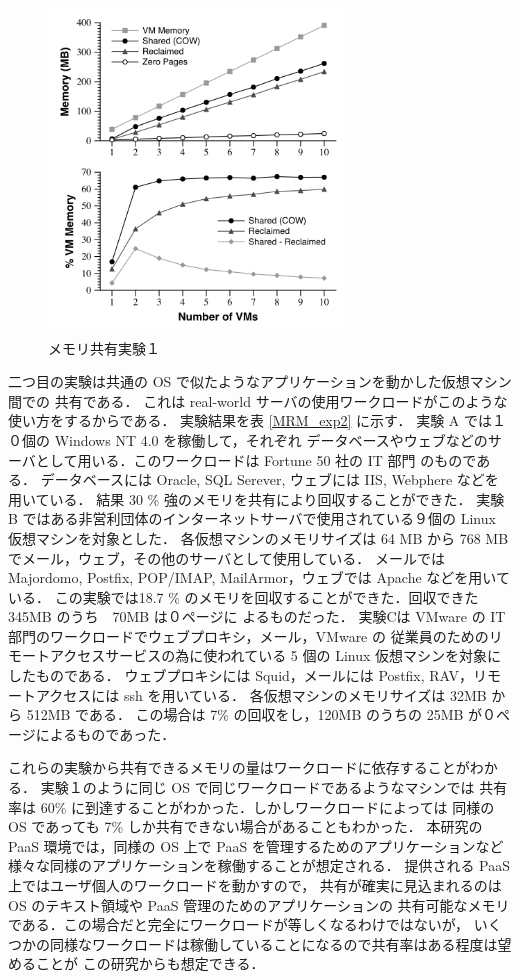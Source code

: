\documentclass[graduation-thesis]{mlarticle}
\begin{document}
\begin{figure}[H]\begin{center}\includegraphics[width=8.0cm]{./img/MRM_exp1.png}\caption{ メモリ共有実験１}\label{MRM_exp1}\end{center}\end{figure}

二つ目の実験は共通の OS で似たようなアプリケーションを動かした仮想マシン間での
共有である．
これは real-world サーバの使用ワークロードがこのような使い方をするからである．
実験結果を表 \ref{MRM_exp2} に示す．
実験 A では１０個の Windows NT 4.0 を稼働して，それぞれ
データベースやウェブなどのサーバとして用いる．このワークロードは Fortune 50 社の IT 部門
のものである．
データベースには Oracle, SQL Serever, ウェブには IIS, Webphere などを用いている．
結果 30 \% 強のメモリを共有により回収することができた．
実験 B ではある非営利団体のインターネットサーバで使用されている９個の Linux 仮想マシンを対象とした．
各仮想マシンのメモリサイズは 64 MB から 768 MB でメール，ウェブ，その他のサーバとして使用している．
メールでは Majordomo, Postfix, POP/IMAP, MailArmor，ウェブでは Apache などを用いている．
この実験では18.7 \% のメモリを回収することができた．回収できた 345MB のうち　70MB は０ページに
よるものだった．
実験Cは VMware の IT 部門のワークロードでウェブプロキシ，メール，VMware の
従業員のためのリモートアクセスサービスの為に使われている 5 個の Linux 仮想マシンを対象にしたものである．
ウェブプロキシには Squid，メールには Postfix, RAV，リモートアクセスには ssh を用いている．
各仮想マシンのメモリサイズは 32MB から 512MB である．
この場合は 7\% の回収をし，120MB のうちの 25MB が０ページによるものであった．

これらの実験から共有できるメモリの量はワークロードに依存することがわかる．
実験１のように同じ OS で同じワークロードであるようなマシンでは
共有率は 60\% に到達することがわかった．しかしワークロードによっては
同様の OS であっても 7\% しか共有できない場合があることもわかった．
本研究の PaaS 環境では，同様の OS 上で PaaS を管理するためのアプリケーションなど
様々な同様のアプリケーションを稼働することが想定される．
提供される PaaS 上ではユーザ個人のワークロードを動かすので，
共有が確実に見込まれるのは OS のテキスト領域や PaaS 管理のためのアプリケーションの
共有可能なメモリである．この場合だと完全にワークロードが等しくなるわけではないが，
いくつかの同様なワークロードは稼働していることになるので共有率はある程度は望めることが
この研究からも想定できる．
\end{document}
